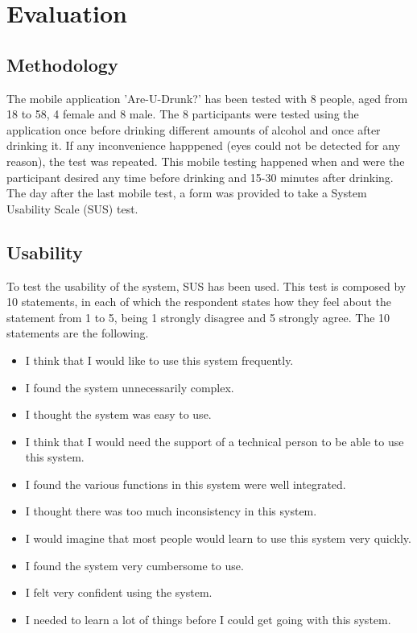 \section{Evaluation}
\label{discussion}

\subsection{Methodology}

The mobile application 'Are-U-Drunk?' has been tested with 8 people, aged from 18 to 58, 4 female and 8 male. The 8 participants were tested using the application once before drinking different amounts of alcohol and once after drinking it. If any inconvenience happpened (eyes could not be detected for any reason), the test was repeated. This mobile testing happened when and were the participant desired any time before drinking and 15-30 minutes after drinking. The day after the last mobile test, a form was provided to take a System Usability Scale (SUS) \cite{sus} test.

\subsection{Usability}

To test the usability of the system, SUS \cite{sus} has been used. This test is composed by 10 statements, in each of which the respondent states how they feel about the statement from 1 to 5, being 1 strongly disagree and 5 strongly agree. The 10 statements are the following.

\begin{itemize}
  \item I think that I would like to use this system frequently.
  \item I found the system unnecessarily complex.
  \item I thought the system was easy to use.
  \item I think that I would need the support of a technical person to be able to use this system.
  \item I found the various functions in this system were well integrated.
  \item I thought there was too much inconsistency in this system.
  \item I would imagine that most people would learn to use this system very quickly.
  \item I found the system very cumbersome to use.
  \item I felt very confident using the system.
  \item I needed to learn a lot of things before I could get going with this system.
\end{itemize}

